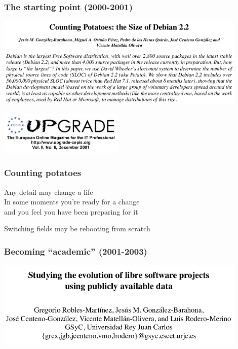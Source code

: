 \documentclass[17pt,aspectratio=169,hyperref=pdfusetitle]{beamer}
\begin{document}
\begin{frame}[fragile]
  \frametitle{The starting point (2000-2001)}

  \begin{center}
  \includegraphics[width=12cm]{figs/counting-potatos}

  \includegraphics[width=6cm]{figs/upgrade}
  \end{center}  
  
\end{frame}

\begin{frame}[fragile]
  \frametitle{Counting potatoes}

  Any detail may change a life \\
  In some moments you're ready for a change \\
  and you feel you have been preparing for it \\
  
  \begin{center}
    Switching fields may be rebooting from scratch
  \end{center}
  
\end{frame}

\begin{frame}[fragile]
  \frametitle{Becoming ``academic'' (2001-2003)}

  \begin{center}
  \includegraphics[width=12cm]{figs/evolution-data}
  \end{center}  
  
\end{frame}
\end{document}
